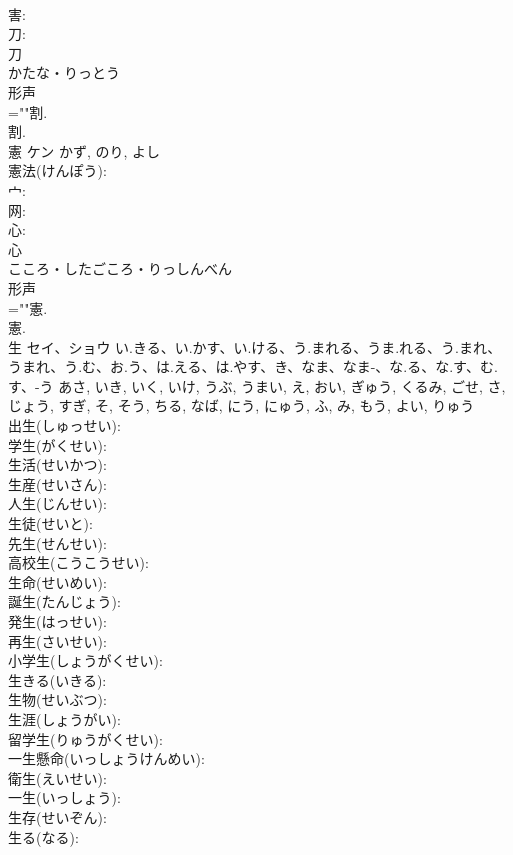 \documentclass[8pt]{extreport}
\begin{document}
\begin{CJK}{UTF8}{min}
\\	害: 
\\	刀: 
\\	刀	
\\	かたな・りっとう	
\\	形声 
\\	=""割.
\\	割.
\\	憲	ケン		かず, のり, よし	
\\	憲法(けんぽう): 
\\	宀: 
\\	网: 
\\	心: 
\\	心	
\\	こころ・したごころ・りっしんべん	
\\	形声 
\\	=""憲.
\\	憲.
\\	生	セイ、ショウ	い.きる、い.かす、い.ける、う.まれる、うま.れる、う.まれ、うまれ、う.む、お.う、は.える、は.やす、き、なま、なま-、な.る、な.す、む.す、-う	あさ, いき, いく, いけ, うぶ, うまい, え, おい, ぎゅう, くるみ, ごせ, さ, じょう, すぎ, そ, そう, ちる, なば, にう, にゅう, ふ, み, もう, よい, りゅう	
\\	出生(しゅっせい): 
\\	学生(がくせい): 
\\	生活(せいかつ): 
\\	生産(せいさん): 
\\	人生(じんせい): 
\\	生徒(せいと): 
\\	先生(せんせい): 
\\	高校生(こうこうせい): 
\\	生命(せいめい): 
\\	誕生(たんじょう): 
\\	発生(はっせい): 
\\	再生(さいせい): 
\\	小学生(しょうがくせい): 
\\	生きる(いきる): 
\\	生物(せいぶつ): 
\\	生涯(しょうがい): 
\\	留学生(りゅうがくせい): 
\\	一生懸命(いっしょうけんめい): 
\\	衛生(えいせい): 
\\	一生(いっしょう): 
\\	生存(せいぞん): 
\\	生る(なる): 

\end{CJK}
\end{document}
